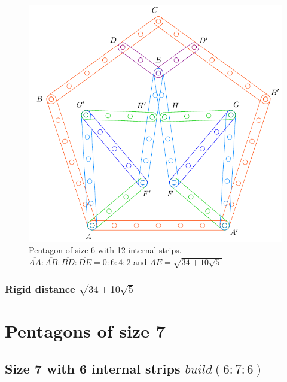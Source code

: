 \documentclass[11pt]{article}
\begin{document}
\begin{figure}[H]
\centering
\includegraphics[scale=0.7]{6/penta6-12a}
\caption{Pentagon of size 6 with 12 internal strips. $\overline{AA}:\overline{AB}:\overline{BD}:\overline{DE} = 0:6:4:2$ and $AE = \sqrt{34 + 10\sqrt5}$} 
\label{fig:penta6-12a}
\end{figure}

\subsubsection{Rigid distance $\sqrt{34 + 10\sqrt5}$}




\section{Pentagons of size 7}

\subsection{Size 7 with 6 internal strips $build(6:7:6)$}
\end{document}
